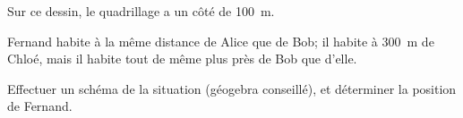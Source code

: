 
\begin{exercice}\label{exo2smath-0212}

    Sur ce dessin, le quadrillage a un côté de \SI{100}{\metre}. 
\begin{center}
   
\end{center}

Fernand habite à la même distance de Alice que de Bob; il habite à \SI{300}{\metre} de Chloé, mais il habite tout de même plus près de Bob que d'elle.

Effectuer un schéma de la situation (géogebra conseillé), et déterminer la position de Fernand.

\end{exercice}
